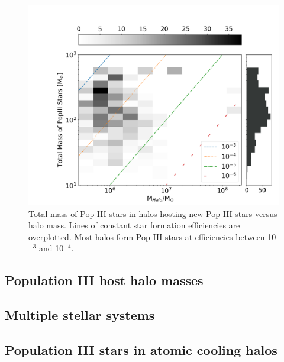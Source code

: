 \documentclass[a4paper,fleqn,usenatbib]{mnras}
\begin{document}
\begin{figure}
	\includegraphics[width=\columnwidth]{images/totp3mass_halomass_sidehist.png}
    \caption{Total mass of Pop III stars in halos hosting new Pop III stars versus halo mass. Lines of constant star formation efficiencies are overplotted. Most halos form Pop III stars at efficiencies between 10$^{-3}$ and 10$^{-4}$.}
    \label{fig:totp3mass_halomass_sidehist}
\end{figure}



\subsection{Population III host halo masses}

\subsection{Multiple stellar systems}

\subsection{Population III stars in atomic cooling halos}
\end{document}
